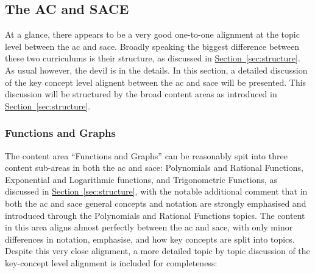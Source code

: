 \documentclass[twoside,12pt,a4paper]{report}
\newcommand{\refsec}[1]{\hyperref[sec:#1]{Section~\ref{sec:#1}}}
\begin{document}
\subsection{The AC and SACE}

At a glance, there appears to be a very good one-to-one alignment at the topic level between the \gls{ac} and \gls{sace}. Broadly speaking the biggest difference between these two curriculums is their structure, as discussed in \refsec{structure}. As usual however, the devil is in the details. In this section, a detailed discussion of the key concept level alignent between the \gls{ac} and \gls{sace} will be presented. This discussion will be structured by the broad content areas as introduced in 
\refsec{structure}.

\subsubsection{Functions and Graphs}

The content area ``Functions and Graphs'' can be reasonably spit into three content sub-areas in both the \gls{ac} and \gls{sace}: Polynomials and Rational Functions, Exponential and Logarithmic functions, and Trigonometric Functions, as discussed in \refsec{structure}, with the notable additional comment that in both the \gls{ac} and \gls{sace} general concepts and notation are strongly emphasised and introduced through the Polynomials and Rational Functions topics. The content in this area aligns almost perfectly between the \gls{ac} and \gls{sace}, with only minor differences in notation, emphasise, and how key concepts are split into topics. Despite this very close alignment, a more detailed topic by topic discussion of the key-concept level alignment is included for completeness:
\end{document}
